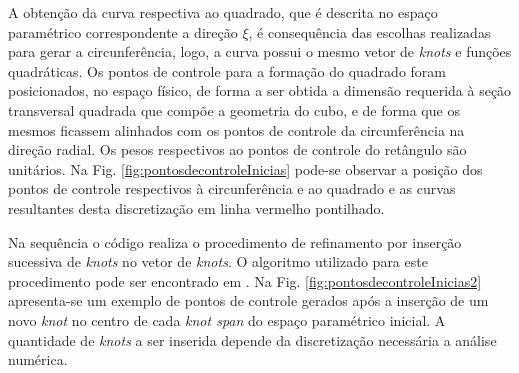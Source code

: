 \documentclass[tese_patricia]{subfiles}
\begin{document}
A obtenção da curva respectiva ao quadrado, que é descrita no espaço paramétrico correspondente a direção $\xi$, é consequência das escolhas realizadas para gerar a circunferência, logo, a curva possui o mesmo vetor de \textit{knots} e funções quadráticas. Os pontos de controle para a formação do quadrado foram posicionados, no espaço físico, de forma a ser obtida a dimensão requerida à seção transversal quadrada que compõe a geometria do cubo, e de forma que os mesmos ficassem alinhados com os pontos de controle da circunferência na direção radial. Os pesos respectivos ao pontos de controle do retângulo são unitários. Na Fig. \ref{fig:pontosdecontroleInicias} pode-se observar a posição dos pontos de controle respectivos à circunferência e ao quadrado e as curvas resultantes desta discretização em linha vermelho pontilhado.

Na sequência o código realiza o procedimento de refinamento por inserção sucessiva de \textit{knots} no vetor de \textit{knots}. O algoritmo utilizado para este procedimento pode ser encontrado em . Na Fig. \ref{fig:pontosdecontroleInicias2} apresenta-se um exemplo de pontos de controle gerados após a inserção de um novo \textit{knot} no centro de cada \textit{knot span} do espaço paramétrico inicial. A quantidade de \textit{knots} a ser inserida depende da discretização necessária a análise numérica.
\end{document}
